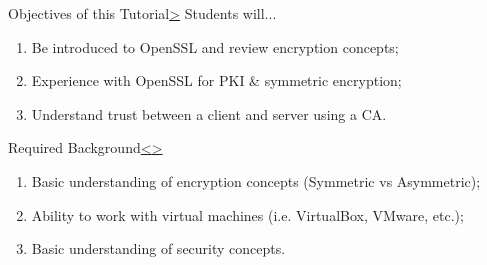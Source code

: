 \documentclass[12pt]{extarticle}
\newenvironment{instructionblock}{\Large\bgroup}{\egroup}
\newcommand{\ben}{\begin{enumerate}}
\newcommand{\een}{\end{enumerate}}
\begin{document}

\pagebreak
\tableofcontents


\pagebreak
{}
\setcounter{section}{1}




	\pagebreak
	\begin{slide}{Objectives of this Tutorial}{\hyperref[slide 2]{\textgreater}}
		\begin{instructionblock}
			Students will...
				\ben 
					\item Be introduced to OpenSSL and review encryption concepts;
					\item Experience with OpenSSL for PKI \& symmetric encryption;
					\item Understand trust between a client and server using a CA.
				\een 
		\end{instructionblock}
	\end{slide}
	\vfill
	
	
	
	
	\pagebreak	
	\begin{slide}{Required Background}{\hyperref[slide 1]{\textless}\hyperref[slide 3]{\textgreater}}
		\begin{instructionblock}
			\ben
				\item Basic understanding of encryption concepts (Symmetric vs Asymmetric);
				\item Ability to work with virtual machines (i.e. VirtualBox, VMware, etc.);
				\item Basic understanding of security concepts.
			\een
		\end{instructionblock}
	\end{slide}
	
	\pagebreak
	
	
\end{document}
